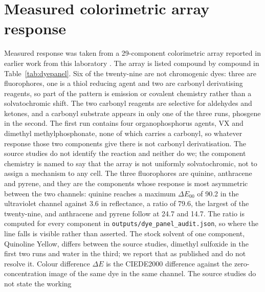 \documentclass[journal=jacsat,manuscript=suppinfo,margin=1in]{achemso}
\begin{document}
\section{Measured colorimetric array response}
\label{meth:deltaE}
Measured response was taken from a 29-component colorimetric array reported in
earlier work from this laboratory \cite{hazref,multiplexref,group3ref}. The
array is listed compound by compound in Table~\ref{tab:dyepanel}.
Six of the
twenty-nine are not chromogenic dyes: three are fluorophores, one is a thiol
reducing agent and two are carbonyl derivatising reagents, so part of the
pattern is emission or covalent chemistry rather than a solvatochromic
shift.
The two carbonyl reagents are selective for aldehydes and ketones, and a
carbonyl substrate appears in only one of the three runs, phosgene in the
second. The first run contains four organophosphorus agents, VX and dimethyl
methylphosphonate, none of which carries a carbonyl, so whatever response those
two components give there is not carbonyl derivatisation. The source studies do
not identify the reaction and neither do we; the component chemistry is named
to say that the array is not uniformly solvatochromic, not to assign a
mechanism to any cell. The three fluorophores are quinine, anthracene and pyrene, and they are
the components whose response is most asymmetric between the two channels:
quinine reaches a maximum $\Delta E_{00}$ of 90.2 in the ultraviolet channel
against 3.6 in reflectance, a ratio of 79.6, the largest of the
twenty-nine, and anthracene and pyrene follow at 24.7 and 14.7. The ratio is
computed for every component in \texttt{outputs/dye\_panel\_audit.json}, so
where the line falls is visible rather than asserted. The
stock solvent of one component, Quinoline Yellow, differs between the source
studies, dimethyl sulfoxide in the first two runs and water in the third; we
report that as published and do not resolve it. Colour difference
$\Delta E$ is the CIEDE2000 difference against the zero-concentration image of
the same dye in the same channel. The source studies do not state the working
\end{document}
